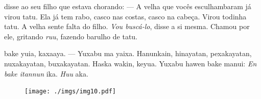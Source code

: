 \mbox{}\vspace*{\fill}



 disse ao seu
filho que estava chorando:\break
--- A velha que vocês esculhambaram
já virou tatu. Ela já tem rabo, casco
nas costas, casco na cabeça. Virou
todinha tatu. A velha sente falta
do filho.\break 
\textit{Vou buscá-lo}, disse a
si mesma. Chamou por ele, gritando
\textit{ruu}, fazendo barulho de tatu.

\vspace{2em}

 bake yuia, kaxaaya.\break
--- Yuxabu ma yaixa. Hanunkain, hinayatan,
pexakayatan, nuxakayatan, buxakayatan.\break
Haska wakin, keyua. Yuxabu hawen bake
manui:\break 
\emph{En bake itannun} ika. \emph{Huu} aka.

\vspace*{\fill}

\pagebreak
\thispagestyle{empty}
\begin{figure}
\vspace*{-.5cm}
\hspace*{-2.2cm}\texttt{[image: ./imgs/img10.pdf]}
\end{figure}

